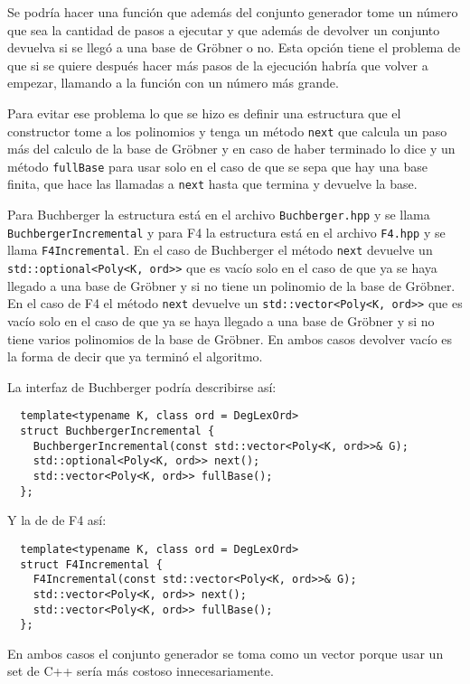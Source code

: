 \documentclass[12pt]{report}
\theoremstyle{customstyle}
\theoremstyle{factstyle}
\begin{document}
Se podría hacer una función que además del conjunto generador tome un número que sea la cantidad de pasos a ejecutar y que además de devolver un conjunto devuelva si se llegó a una base de Gröbner o no. Esta opción tiene el problema de que si se quiere después hacer más pasos de la ejecución habría que volver a empezar, llamando a la función con un número más grande.

Para evitar ese problema lo que se hizo es definir una estructura que el constructor tome a los polinomios y tenga un método \texttt{next} que calcula un paso más del calculo de la base de Gröbner y en caso de haber terminado lo dice y un método \texttt{fullBase} para usar solo en el caso de que se sepa que hay una base finita, que hace las llamadas a \texttt{next} hasta que termina y devuelve la base.

Para Buchberger la estructura está en el archivo \texttt{Buchberger.hpp} y se llama \texttt{BuchbergerIncremental} y para F4 la estructura está en el archivo \texttt{F4.hpp} y se llama \texttt{F4Incremental}. En el caso de Buchberger el método \texttt{next} devuelve un \texttt{std::optional<Poly<K, ord>>} que es vacío solo en el caso de que ya se haya llegado a una base de Gröbner y si no tiene un polinomio de la base de Gröbner. En el caso de F4 el método \texttt{next} devuelve un \texttt{std::vector<Poly<K, ord>>} que es vacío solo en el caso de que ya se haya llegado a una base de Gröbner y si no tiene varios polinomios de la base de Gröbner. En ambos casos devolver vacío es la forma de decir que ya terminó el algoritmo.

La interfaz de Buchberger podría describirse así:

\begin{verbatim}
  template<typename K, class ord = DegLexOrd>
  struct BuchbergerIncremental {
    BuchbergerIncremental(const std::vector<Poly<K, ord>>& G);
    std::optional<Poly<K, ord>> next();
    std::vector<Poly<K, ord>> fullBase();
  };
\end{verbatim}

Y la de de F4 así:

\begin{verbatim}
  template<typename K, class ord = DegLexOrd>
  struct F4Incremental {
    F4Incremental(const std::vector<Poly<K, ord>>& G);
    std::vector<Poly<K, ord>> next();
    std::vector<Poly<K, ord>> fullBase();
  };
\end{verbatim}

En ambos casos el conjunto generador se toma como un vector porque usar un set de C++ sería más costoso innecesariamente.
\end{document}
